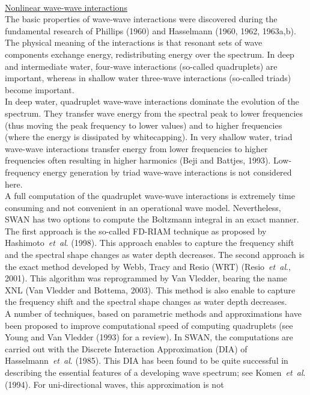\documentclass[12pt]{book}
\begin{document}
\\[2ex]
\noindent
\underline{Nonlinear wave-wave interactions}\\[2ex]
The basic properties of wave-wave interactions were discovered during the fundamental research
of Phillips (1960) and Hasselmann (1960, 1962, 1963a,b). The physical meaning of the interactions is that
resonant sets of wave components exchange energy, redistributing energy over the spectrum. In deep
and intermediate water, four-wave interactions (so-called quadruplets) are important, whereas
in shallow water three-wave interactions (so-called triads) become important.
\\[2ex]
\noindent
In deep water, quadruplet wave-wave interactions dominate the evolution of the spectrum. They transfer
wave energy from the spectral peak to lower frequencies (thus moving the peak frequency to lower values)
and to higher frequencies (where the energy is dissipated by whitecapping). In very shallow water, triad
wave-wave interactions transfer energy from lower frequencies to higher frequencies often resulting in
higher harmonics (Beji and Battjes, 1993). Low-frequency energy generation by triad wave-wave
interactions is not considered here.
\\[2ex]
\noindent
A full computation of the quadruplet wave-wave interactions is extremely time consuming and not
convenient in an operational wave model. Nevertheless, SWAN has two options to compute the Boltzmann integral
in an exact manner. The first approach is the so-called FD-RIAM technique as proposed by Hashimoto~{\it et~al}.
(1998). This approach enables to capture the frequency shift and the spectral shape changes as water depth
decreases. The second approach is the exact method developed by Webb, Tracy and Resio (WRT)
(Resio~{\it et~al}., 2001). This algorithm was reprogrammed by Van Vledder, bearing the name XNL
(Van Vledder and Bottema, 2003). This method is also enable to capture the frequency shift and the spectral
shape changes as water depth decreases.
\\[2ex]
\noindent
A number of techniques, based on parametric methods and approximations have been proposed to
improve computational speed of computing quadruplets (see Young and Van Vledder (1993) for a review). In SWAN,
the computations are carried out with the Discrete Interaction Approximation (DIA) of Hasselmann~{\it et~al}.
(1985). This DIA has been found to be quite successful in describing the essential features of a
developing wave spectrum; see Komen~{\it et~al}. (1994). For uni-directional waves, this approximation is not
\end{document}
